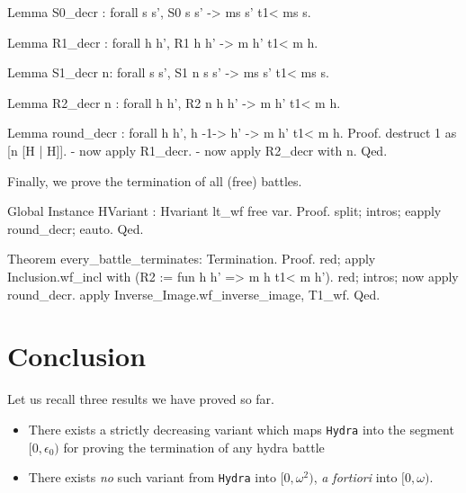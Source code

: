\documentclass[a4paper]{book}
\begin{document}
\begin{Coqsrc}
Lemma S0_decr :
  forall s s', S0  s s' -> ms s' t1< ms s.
\end{Coqsrc}

\begin{Coqsrc}
Lemma R1_decr : forall h h',
                  R1 h h' -> m h' t1< m h.
\end{Coqsrc}

\begin{Coqsrc}
Lemma S1_decr n:
  forall s s', S1 n s s' -> ms s' t1<  ms s.
\end{Coqsrc}

\begin{Coqsrc}
Lemma R2_decr n : forall h h', R2 n h h' -> m h'  t1< m h.
\end{Coqsrc}


\begin{Coqsrc}
Lemma round_decr : forall h h', h -1-> h' -> m h' t1< m h.
Proof.
   destruct 1 as [n [H | H]].
   -  now apply R1_decr.
   -  now apply R2_decr with n.
Qed.
\end{Coqsrc}

Finally, we prove the termination of all (free) battles.

\label{thm:every-battle-terminates}

\begin{Coqsrc}
Global Instance HVariant : Hvariant lt_wf free var.
Proof.
 split; intros; eapply round_decr; eauto.
Qed.

Theorem every_battle_terminates: Termination.
Proof. 
  red; apply Inclusion.wf_incl with 
         (R2 := fun h h' =>  m h t1< m h').
   red; intros;  now apply round_decr.
   apply Inverse_Image.wf_inverse_image, T1_wf.
Qed.
\end{Coqsrc}


\section*{Conclusion}

Let us recall three results we have proved so far.
\begin{itemize}
\item There exists a strictly decreasing variant which maps \texttt{Hydra} into 
the segment $[0,\epsilon_0)$ for proving the termination of any hydra battle
\item There exists \emph{no} such variant from \texttt{Hydra} into 
$[0,\omega^2)$, \emph{a fortiori} into $[0,\omega)$.
\end{itemize}
\end{document}
